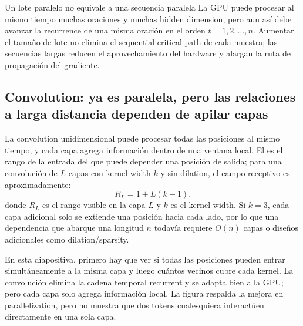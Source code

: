 \begin{warningbox}{Un lote paralelo no equivale a una secuencia paralela}
La GPU puede procesar al mismo tiempo muchas oraciones y muchas hidden dimension, pero aun así debe avanzar la recurrence de una misma oración en el orden $t=1,2,\ldots,n$. Aumentar el tamaño de lote no elimina el sequential critical path de cada muestra; las secuencias largas reducen el aprovechamiento del hardware y alargan la ruta de propagación del gradiente.
\end{warningbox}


\subsection{Convolution: ya es paralela, pero las relaciones a larga distancia dependen de apilar capas}

La convolution unidimensional puede procesar todas las posiciones al mismo tiempo, y cada capa agrega información dentro de una ventana local. El  es el rango de la entrada del que puede depender una posición de salida; para una convolución de $L$ capas con kernel width $k$ y sin dilation, el campo receptivo es aproximadamente:
\[
R_L=1+L(k-1).
\]
donde $R_L$ es el rango visible en la capa $L$ y $k$ es el kernel width. Si $k=3$, cada capa adicional solo se extiende una posición hacia cada lado, por lo que una dependencia que abarque una longitud $n$ todavía requiere $O(n)$ capas o diseños adicionales como dilation/sparsity.


En esta diapositiva, primero hay que ver si todas las posiciones pueden entrar simultáneamente a la misma capa y luego cuántos vecinos cubre cada kernel. La convolución elimina la cadena temporal recurrent y se adapta bien a la GPU; pero cada capa solo agrega información local. La figura respalda la mejora en parallelization, pero no muestra que dos tokens cualesquiera interactúen directamente en una sola capa.

